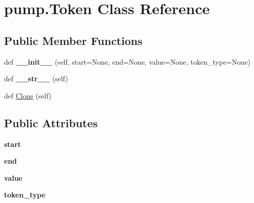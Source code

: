 \hypertarget{classpump_1_1Token}{}\section{pump.\+Token Class Reference}
\label{classpump_1_1Token}
\subsection*{Public Member Functions}
\begin{DoxyCompactItemize}
\item 
def {\bfseries \+\_\+\+\_\+init\+\_\+\+\_\+} (self, start=None, end=None, value=None, token\+\_\+type=None)\hypertarget{classpump_1_1Token_a55e6843fd724dc3771861372d5116f48}{}\label{classpump_1_1Token_a55e6843fd724dc3771861372d5116f48}

\item 
def {\bfseries \+\_\+\+\_\+str\+\_\+\+\_\+} (self)\hypertarget{classpump_1_1Token_ad0079ae4449d89bc2d5756488099cb33}{}\label{classpump_1_1Token_ad0079ae4449d89bc2d5756488099cb33}

\item 
def \hyperlink{classpump_1_1Token_abc0f2d2a0bcad953f5fc85a4e52076eb}{Clone} (self)
\end{DoxyCompactItemize}
\subsection*{Public Attributes}
\begin{DoxyCompactItemize}
\item 
{\bfseries start}\hypertarget{classpump_1_1Token_a53e3333a770bc8773224a5af78bca5bb}{}\label{classpump_1_1Token_a53e3333a770bc8773224a5af78bca5bb}

\item 
{\bfseries end}\hypertarget{classpump_1_1Token_abb88c0ece4274cfd974fd01d0468953c}{}\label{classpump_1_1Token_abb88c0ece4274cfd974fd01d0468953c}

\item 
{\bfseries value}\hypertarget{classpump_1_1Token_a5b7ab395a380b775b2bf0a8b0abfda86}{}\label{classpump_1_1Token_a5b7ab395a380b775b2bf0a8b0abfda86}

\item 
{\bfseries token\+\_\+type}\hypertarget{classpump_1_1Token_aeac105b76f6af13c8c64ba0a94e37d90}{}\label{classpump_1_1Token_aeac105b76f6af13c8c64ba0a94e37d90}

\end{DoxyCompactItemize}


